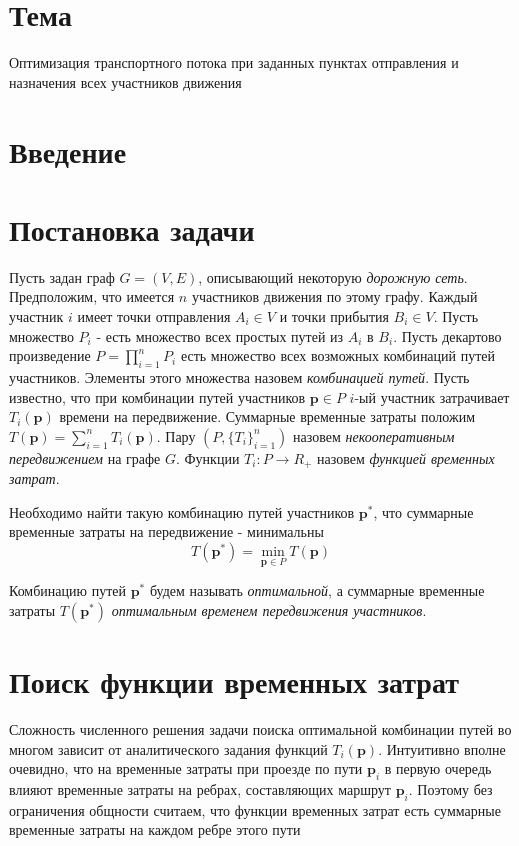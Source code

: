 \documentclass[12pt, a4paper]{article}
\DeclareMathOperator*{\minn}{min}
\begin{document}
 \section*{Тема}
Оптимизация транспортного потока при заданных пунктах отправления и назначения всех участников движения


\section{Введение}


\newpage
\section{Постановка задачи}

Пусть задан граф $G = (V, E)$, описывающий некоторую \textit{дорожную сеть}. Предположим, что имеется $n$ участников движения по этому графу. Каждый участник $i$ имеет точки отправления $A_i \in V$ и точки прибытия $B_i \in V$. Пусть множество $P_i$ - есть множество всех простых путей из $A_i$ в $B_i$. Пусть декартово произведение $P = \prod \limits_{i = 1} ^ n P_i$ есть множество всех возможных комбинаций путей участников. Элементы этого множества назовем \textit{комбинацией путей}. Пусть известно, что при комбинации путей участников $\textbf{p} \in P$ $i$-ый участник затрачивает $T_i(\textbf{p})$ времени на передвижение. Суммарные временные затраты положим $T(\textbf{p}) = \sum\limits_{i = 1}^n T_i (\textbf{p})$. Пару $(P, \{T_i\}_{i = 1} ^ n)$ назовем \textit{некооперативным передвижением} на графе $G$. Функции $T_i: P \rightarrow R_+$ назовем \textit{функцией временных затрат}.

Необходимо найти такую комбинацию путей участников $\textbf{p}^*$, что суммарные временные затраты на передвижение - минимальны
\begin{equation}
\label{eq:target_task_T} 
T (\textbf{p}^*) = \minn\limits_{ \textbf{p} \in P} T (\textbf{p})
\end{equation}
	
Комбинацию путей $\textbf{p}^*$ будем называть \textit {оптимальной}, а суммарные временные затраты  $ T (\textbf{p}^*)$ \textit {оптимальным временем передвижения участников}.

\newpage
\section{Поиск функции временных затрат}

Сложность численного решения задачи поиска оптимальной комбинации путей во многом зависит от аналитического задания функций
$T_i (\textbf{p})$. Интуитивно вполне очевидно, что на временные затраты при проезде по пути $\textbf{p}_i$ в первую очередь влияют временные затраты на ребрах, составляющих маршрут $\textbf{p}_i$. Поэтому без ограничения общности считаем, что функции временных затрат есть суммарные временные затраты на каждом ребре этого пути
\end{document}

